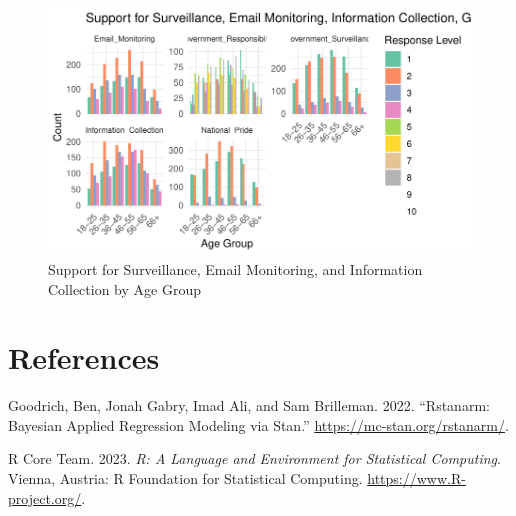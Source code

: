 \documentclass[
  letterpaper,
  DIV=11,
  numbers=noendperiod]{scrartcl}
\newlength{\cslhangindent}
\newlength{\cslentryspacingunit} %
\newenvironment{CSLReferences}[2] %
 {%
  \setlength{\parindent}{0pt}
  \ifodd #1
  \let\oldpar\par
  \def\par{\hangindent=\cslhangindent\oldpar}
  \fi
  \setlength{\parskip}{#2\cslentryspacingunit}
 }%
 {}
\begin{document}
\begin{figure}

{\centering \includegraphics{paper_files/figure-pdf/fig-compiled-1.pdf}

}

\caption{\label{fig-compiled}Support for Surveillance, Email Monitoring,
and Information Collection by Age Group}

\end{figure}

\newpage

\hypertarget{references}{%
\section*{References}\label{references}}

\hypertarget{refs}{}
\begin{CSLReferences}{1}{0}
\leavevmode{}%
Goodrich, Ben, Jonah Gabry, Imad Ali, and Sam Brilleman. 2022.
{``Rstanarm: {Bayesian} Applied Regression Modeling via {Stan}.''}
\url{https://mc-stan.org/rstanarm/}.

\leavevmode{}%
R Core Team. 2023. \emph{R: A Language and Environment for Statistical
Computing}. Vienna, Austria: R Foundation for Statistical Computing.
\url{https://www.R-project.org/}.

\end{CSLReferences}
\end{document}
